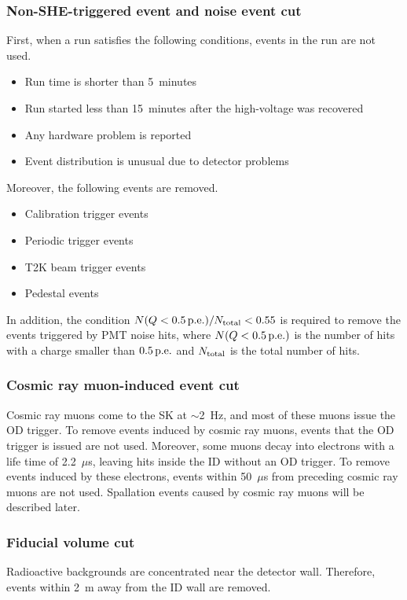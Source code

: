 \subsubsection{Non-SHE-triggered event and noise event cut}
\vs\hs
First, when a run satisfies the following conditions, events in the run are not used.
\begin{itemize}
	\item Run time is shorter than 5~minutes
	\item Run started less than 15~minutes after the high-voltage was recovered
	\item Any hardware problem is reported
	\item Event distribution is unusual due to detector problems
\end{itemize}
\hs
Moreover, the following events are removed.
\begin{itemize}
	\item Calibration trigger events
	\item Periodic trigger events
	\item T2K beam trigger events
	\item Pedestal events
\end{itemize}
\hs
In addition, the condition $N(Q < 0.5\,{\rm p.e.})/N_{\rm total} < 0.55$ is required to remove the events triggered by PMT noise hits, where $N(Q < 0.5\,{\rm p.e.})$ is the number of hits with a charge smaller than $0.5\,{\rm p.e.}$ and $N_{\rm total}$ is the total number of hits.

\subsubsection{Cosmic ray muon-induced event cut}
\vs\hs
Cosmic ray muons come to the SK at $\sim$2~Hz, and most of these muons issue the OD trigger.
To remove events induced by cosmic ray muons, events that the OD trigger is issued are not used.
Moreover, some muons decay into electrons with a life time of 2.2~$\mu$s, leaving hits inside the ID without an OD trigger.
To remove events induced by these electrons, events within 50~$\mu$s from preceding cosmic ray muons are not used.
Spallation events caused by cosmic ray muons will be described later.

\subsubsection{Fiducial volume cut}
\vs\hs
Radioactive backgrounds are concentrated near the detector wall.
Therefore, events within 2~m away from the ID wall are removed.

